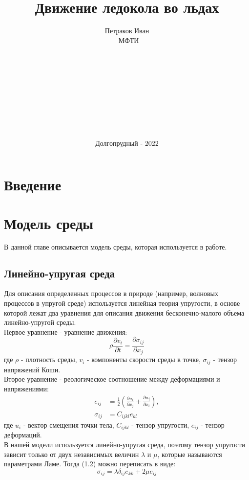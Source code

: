 \documentclass[12pt,a4paper, titlepage, openany]{book}
\title{Движение ледокола во льдах}
\date{Долгопрудный - 2022}
\author{Петраков Иван\\\ МФТИ\\\\\\\\\\\\\\\\\\\\}
\begin{document}
\maketitle

\tableofcontents

\chapter*{Введение}

\chapter{Модель среды}
В данной главе описывается модель среды, которая используется в работе.

\section*{Линейно-упругая среда}
Для описания определенных процессов в природе (например, волновых процессов в упругой среде) используется линейная теория упругости, в основе которой лежат два уравнения для описания движения бесконечно-малого объема линейно-упругой среды.\\
Первое уравнение - уравнение движения:
\begin{equation}
\rho \frac{\partial v_i}{\partial t} = \frac{\partial \sigma_{ij}}{\partial x_j}
\end{equation}
где $\rho$ - плотность среды, $v_i$ - компоненты скорости среды в точке, $\sigma_{ij}$ - тензор напряжений Коши.\\
Второе уравнение - реологическое соотношение между деформациями и напряжениями:
\begin{equation}
\begin{aligned}
e_{ij} &= \frac{1}{2}(\frac{\partial u_i}{\partial x_j} + \frac{\partial u_j}{\partial x_i}),\\
\sigma_{ij} &= C_{ijkl} e_{kl}
\end{aligned}
\end{equation}
где $u_i$ - вектор смещения точки тела, $C_{ijkl}$ - тензор упругости, $e_{ij}$ - тензор деформаций.
\\
В нашей модели используется линейно-упругая среда, поэтому тензор упругости зависит только от двух независимых величин $\lambda$ и $\mu$, которые называются параметрами Ламе. Тогда (1.2) можно переписать в виде:
\begin{equation}
\sigma_{ij} = \lambda \delta_{ij} e_{kk} + 2 \mu e_{ij}
\end{equation}
\end{document}
